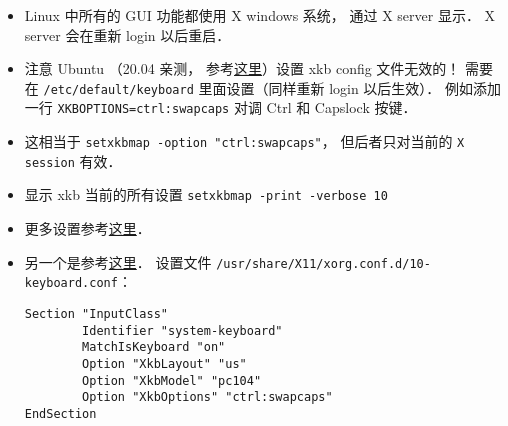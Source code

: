 
\begin{issues}
\issueDraft
\end{issues}

\begin{itemize}
\item Linux 中所有的 GUI 功能都使用 X windows 系统， 通过 X server 显示． X server 会在重新 login 以后重启．
\item 注意 Ubuntu （20.04 亲测， 参考\href{https://manpages.ubuntu.com/manpages/focal/en/man5/keyboard.5.html}{这里}）设置 xkb config 文件无效的！ 需要在 \verb|/etc/default/keyboard| 里面设置（同样重新 login 以后生效）． 例如添加一行 \verb|XKBOPTIONS=ctrl:swapcaps| 对调 Ctrl 和 Capslock 按键．
\item 这相当于 \verb|setxkbmap -option "ctrl:swapcaps"|， 但后者只对当前的 \verb|X session| 有效．
\item 显示 xkb 当前的所有设置 \verb|setxkbmap -print -verbose 10|
\item 更多设置参考\href{https://gist.github.com/jatcwang/ae3b7019f219b8cdc6798329108c9aee}{这里}．
\item 另一个是参考\href{https://www.linux.com/training-tutorials/hacking-your-linux-keyboard-xkb/}{这里}． 设置文件 \verb`/usr/share/X11/xorg.conf.d/10-keyboard.conf`：
\begin{lstlisting}
Section "InputClass"
        Identifier "system-keyboard"
        MatchIsKeyboard "on"
        Option "XkbLayout" "us"
        Option "XkbModel" "pc104"
        Option "XkbOptions" "ctrl:swapcaps"
EndSection
\end{lstlisting}
\end{itemize}
